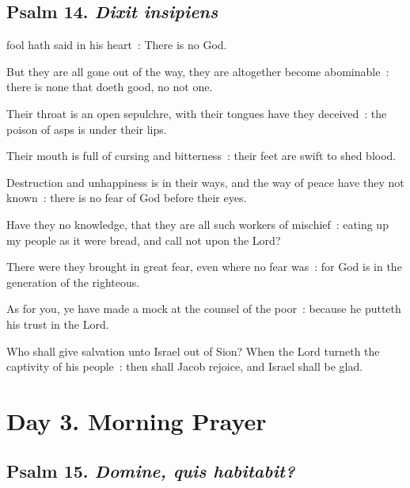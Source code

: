 \clearpage
\subsection{Psalm 14. \textit{Dixit insipiens}}


 fool hath said in his heart~: There is no God.\par
{}
But they are all gone out of the way, they are altogether become abominable~: there is none that doeth good, no not one.\par
{}Their throat is an open sepulchre, with their tongues have they deceived~: the poison of asps is under their lips.\par
{}Their mouth is full of cursing and bitterness~: their feet are swift to shed blood.\par
{}Destruction and unhappiness is in their ways, and the way of peace have they not known~: there is no fear of God before their eyes.\par
{}Have they no knowledge, that they are all such workers of mischief~: eating up my people as it were bread, and call not upon the Lord?\par
{}There were they brought in great fear, even where no fear was~: for God is in the generation of the righteous.\par
{}As for you, ye have made a mock at the counsel of the poor~: because he putteth his trust in the Lord.\par
{}Who shall give salvation unto Israel out of Sion? When the Lord turneth the captivity of his people~: then shall Jacob rejoice, and Israel shall be glad.\par

\section*{Day 3. Morning Prayer}

\subsection{Psalm 15. \textit{Domine, quis habitabit?}}

